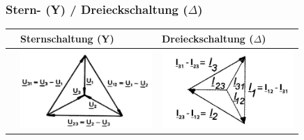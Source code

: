 		\subsubsection{Stern- (Y) / Dreieckschaltung ($\Delta$)}
            	\renewcommand{\arraystretch}{1.5}
			\begin{tabular}{| p{4.5cm} | l | l |}
				\hline
	 				& Sternschaltung (Y)		& Dreieckschaltung ($\Delta$)\\
	 			\hline
	 			\vspace{0.2cm}
	 				&
	 					\parbox[c][3.5cm][c]{5cm}{\includegraphics[width=5cm]{bilder/Sternspannung.png}} &
	 					\parbox[c][3.5cm][c]{5cm}{\includegraphics[width=5cm]{bilder/Dreieckstrom.png}} \\
						

\end{tabular}
